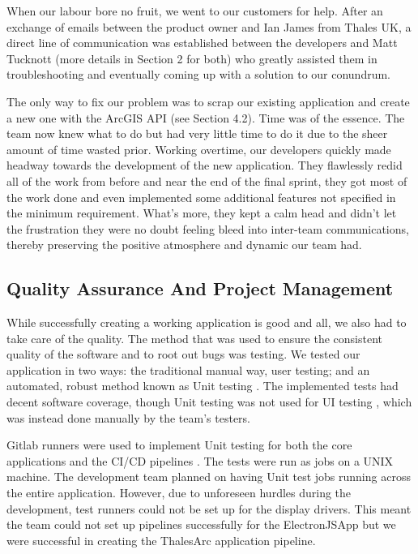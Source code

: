 \documentclass{l3proj}
\begin{document}
When our labour bore no fruit, we went to our customers for help. After an exchange of emails between the product owner and Ian James from Thales UK, a direct line of communication was established between the developers and Matt Tucknott (more details in Section 2 for both) who greatly assisted them in troubleshooting and eventually coming up with a solution to our conundrum.

The only way to fix our problem was to scrap our existing application and create a new one with the ArcGIS API (see Section 4.2). Time was of the essence. The team now knew what to do but had very little time to do it due to the sheer amount of time wasted prior. Working overtime, our developers quickly made headway towards the development of the new application. They flawlessly redid all of the work from before and near the end of the final sprint, they got most of the work done and even implemented some additional features not specified in the minimum requirement. What’s more, they kept a calm head and didn’t let the frustration they were no doubt feeling bleed into inter-team communications, thereby preserving the positive atmosphere and dynamic our team had.

\subsection{Quality Assurance And Project Management}
 
While successfully creating a working application is good and all, we also had to take care of the quality. The method that was used to ensure the consistent quality of the software and to root out bugs was testing. We tested our application in two ways: the traditional manual way, user testing; and an automated, robust method known as Unit testing \cite{unit}. The implemented tests had decent software coverage, though Unit testing was not used for UI testing \cite{uitest}, which was instead done manually by the team's testers.

Gitlab runners \cite{runner} were used to implement Unit testing for both the core applications and the CI/CD pipelines \cite{pipe}. The tests were run as jobs on a UNIX machine. The development team planned on having Unit test jobs running across the entire application. However, due to unforeseen hurdles during the development, test runners could not be set up for the display drivers. This meant the team could not set up pipelines successfully for the ElectronJSApp but we were successful in creating the ThalesArc application pipeline.
\end{document}
